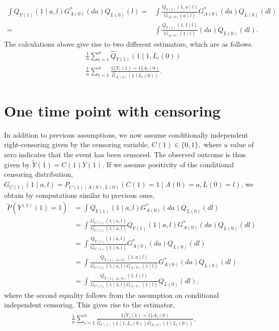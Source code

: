 \documentclass{article}
\newcommand{\A}[1]{A(#1)}
\renewcommand{\L}[1]{L(#1)}
\newcommand{\Y}[1]{Y(#1)}
\newcommand{\C}[1]{C(#1)}
\newcommand{\Ytilde}[1]{\tilde{Y}(#1)}
\newcommand{\Ystar}[2]{Y^{(#1)}(#2)}
\newcommand{\Asubs}[2]{A_{#1}(#2)}
\newcommand{\Lsubs}[2]{L_{#1}(#2)}
\newcommand{\Ysubs}[2]{Y_{#1}(#2)}
\newcommand{\Ytsubs}[2]{\tilde{Y}_{#1}(#2)}
\begin{document}
\begin{align*}
    \int Q_{\Y{1}}(1\mid a,l)G^*_{\A{0}}(da)Q_{\L{0}}(l)=&\int\frac{Q_{\Y{1}}(1,a\mid l)}{G_{\A{0}}(a\mid l)}G^*_{\A{0}}(da)Q_{\L{0}}(dl)\\
    =&\int\frac{Q_{\Y{1}}(1,1\mid l)}{G_{\A{0}}(1\mid l)}(da)Q_{\L{0}}(dl).
\end{align*}
The calculations above give rise to two different estimators, which are as follows.
\begin{align*}
    &\frac{1}{n}\sum_{i=1}^n\hat{Q}_{\Y{1}}(1\mid 1,\Lsubs{i}{0})\tag{G-formula}\\
    &\frac{1}{n}\sum_{i=1}^n\frac{\mathds{1}\{\Ysubs{i}{1}=1\}\Asubs{i}{0}}{\hat{G}_{\Asubs{i}{0}}(1\mid \Lsubs{i}{0})}.\tag{IPTW}
\end{align*}
\section{One time point with censoring}
In addition to previous assumptions, we now assume conditionally independent right-censoring given by the censoring variable, $\C{1}\in\{0,1\},$ where a value of zero indicates that the event has been censored. The observed outcome is thus given by $\Ytilde{1}=\C{1}\Y{1}$. If we assume positivity of the conditional censoring distribution, $G_{\C{1}}(1\mid a,l)=P_{\C{1}\mid \A{0},\L{0}}(\C{1}=1\mid \A{0}=a, \L{0}=l)$, we obtain by computations similar to previous ones,
\begin{align*}
    \tilde{P}(\Ystar{1}{1}=1)&=\int Q_{\Y{1}}(1\mid a,l)G^*_{\A{0}}(da)Q_{\L{0}}(dl)\\
    &=\int\frac{G_{\C{1}}(1\mid a,l)}{G_{\C{1}}(1\mid a,l)}Q_{\Y{1}}(1\mid a,l)G^*_{\A{0}}(da)Q_{\L{0}}(dl)\\
    &=\int\frac{Q_{\Ytilde{1}}(1\mid a,l)}{G_{\C{1}}(1\mid a,l)}G^*_{\A{0}}(da)Q_{\L{0}}(dl)\\
    &=\int\frac{Q_{\Ytilde{1},\A{0}}(1,a\mid l)}{G_{\C{1}}(1\mid a,l)G_{\A{0}}(1\mid l)}G^*_{\A{0}}(da)Q_{\L{0}}(dl)\\
    &=\int\frac{Q_{\Ytilde{1},\A{0}}(1,1\mid l)}{G_{\C{1}}(1\mid 1,l)G_{\A{0}}(1\mid l)}Q_{\L{0}}(dl),
\end{align*}
where the second equality follows from the assumption on conditional independent censoring. This gives rise to the estimator,
\begin{align*}
    &\frac{1}{n}\sum_{i=1}^n\frac{\mathds{1}\{\Ytsubs{i}{1}=1\}\Asubs{i}{0}}{\hat{G}_{\C{1}}(1\mid 1,\Lsubs{i}{0})\hat{G}_{\A{0}}(1\mid \Lsubs{i}{0})}.\tag{IPCW}
\end{align*}
\end{document}
